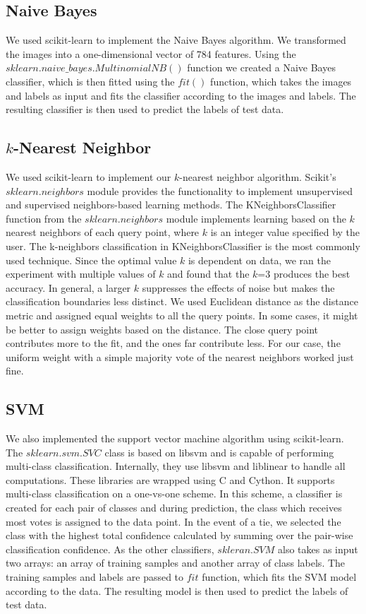 \subsection{Naive Bayes}
We used scikit-learn to implement the Naive Bayes algorithm. We transformed the images into a one-dimensional vector of 784 features. 
Using the $sklearn.naive\_bayes.MultinomialNB()$ function we created a Naive Bayes classifier, which is then fitted using the $fit()$ function, which takes the images and labels as input and fits the classifier according to the images and labels. The resulting classifier is then used to predict the labels of test data.

\subsection{$k$-Nearest Neighbor}
 We used scikit-learn to implement our $k$-nearest neighbor algorithm. Scikit's $sklearn.neighbors$ module provides the functionality to implement unsupervised and supervised neighbors-based learning methods. 
 The KNeighborsClassifier function from the $sklearn.neighbors$ module implements learning based on the $k$ nearest neighbors of each query point, where $k$ is an integer value specified by the user. The k-neighbors classification in KNeighborsClassifier is the most commonly used technique. Since the optimal value $k$ is dependent on data, we ran the experiment with multiple values of $k$ and found that the $k$=3 produces the best accuracy. In general, a larger $k$ suppresses the effects of noise but makes the classification boundaries less distinct.
 We used Euclidean distance as the distance metric and assigned equal weights to all the query points. In some cases, it might be better to assign weights based on the distance. The close query point contributes more to the fit, and the ones far contribute less. For our case, the uniform weight with a simple majority vote of the nearest neighbors worked just fine.

\subsection{SVM}
We also implemented the support vector machine algorithm using scikit-learn. The $sklearn.svm.SVC$ class is based on libsvm and is capable of performing multi-class classification. Internally, they use libsvm and liblinear to handle all computations. These libraries are wrapped using C and Cython. It supports multi-class classification on a one-vs-one scheme. In this scheme, a classifier is created for each pair of classes and during prediction, the class which receives most votes is assigned to the data point. In the event of a tie, we selected the class with the highest total confidence calculated by summing over the pair-wise classification confidence. 
As the other classifiers, $skleran.SVM$ also takes as input two arrays: an array of training samples and another array of class labels. The training samples and labels are passed to $fit$ function, which fits the SVM model according to the data. The resulting model is then used to predict the labels of test data. 

